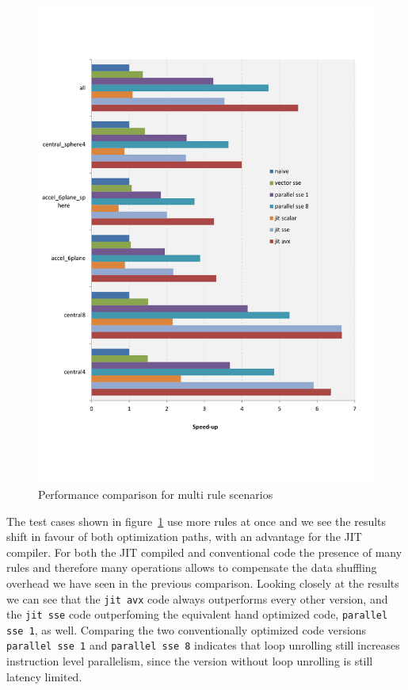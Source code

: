 \begin{figure}[th]\centering
  \includegraphics[scale=0.6]{multi_rules.pdf}
  \caption{Performance comparison for multi rule scenarios
  \label{perf_multi}}
\end{figure}

The test cases shown in figure~\ref{perf_multi} use more rules at once and we see the results shift in favour of both optimization paths, with an advantage for the JIT compiler. For both the JIT compiled and conventional code the presence of many rules and therefore many operations allows to compensate the data shuffling overhead we have seen in the previous comparison. Looking closely at the results we can see that the \texttt{jit avx} code always outperforms every other version, and the \texttt{jit sse} code outperfoming the equivalent hand optimized code, \texttt{parallel sse 1}, as well. Comparing the two conventionally optimized code versions \texttt{parallel sse 1} and \texttt{parallel sse 8} indicates that loop unrolling still increases instruction level parallelism, since the version without loop unrolling is still latency limited.

